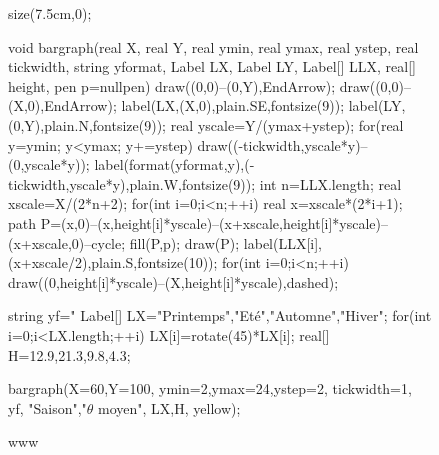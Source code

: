 \documentclass[]{article}
\begin{document}
\begin{figure}[!ht]
	\centering
	\begin{asy}
	size(7.5cm,0);

void bargraph(real X, real Y,
              real ymin, real ymax, real ystep,
              real tickwidth, string yformat,
              Label LX, Label LY, Label[] LLX,
              real[] height,
              pen p=nullpen){
    draw((0,0)--(0,Y),EndArrow);
    draw((0,0)--(X,0),EndArrow);
    label(LX,(X,0),plain.SE,fontsize(9));
    label(LY,(0,Y),plain.N,fontsize(9));
    real yscale=Y/(ymax+ystep);
    for(real y=ymin; y<ymax; y+=ystep) {
        draw((-tickwidth,yscale*y)--(0,yscale*y));
        label(format(yformat,y),(-tickwidth,yscale*y),plain.W,fontsize(9));
    }
    int n=LLX.length;
    real xscale=X/(2*n+2);
    for(int i=0;i<n;++i) {
        real x=xscale*(2*i+1);
        path P=(x,0)--(x,height[i]*yscale)--(x+xscale,height[i]*yscale)--(x+xscale,0)--cycle;
        fill(P,p);
        draw(P);
        label(LLX[i],(x+xscale/2),plain.S,fontsize(10));
    }
    for(int i=0;i<n;++i)
        draw((0,height[i]*yscale)--(X,height[i]*yscale),dashed);
}

string yf="%
Label[] LX={"Printemps","Et\'e","Automne","Hiver"};
for(int i=0;i<LX.length;++i) LX[i]=rotate(45)*LX[i];
real[] H={12.9,21.3,9.8,4.3};

bargraph(X=60,Y=100,
         ymin=2,ymax=24,ystep=2,
         tickwidth=1,
         yf,
         "Saison","$\theta$ moyen",
         LX,H,
         yellow);
	\end{asy}
	\caption{www}
\end{figure}
\end{document}
